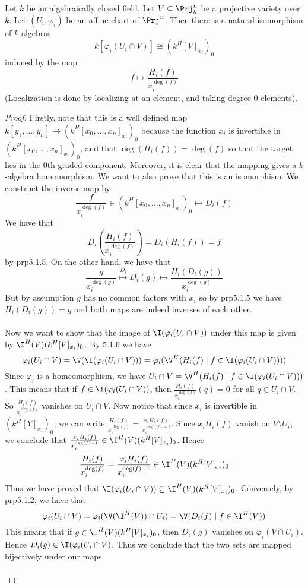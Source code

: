 \documentclass[a4paper]{article}
\begin{document}
\begin{prp}{}{} Let $k$ be an algebraically closed field. Let $V\subseteq\Prj_k^n$ be a projective variety over $k$. Let $(U_i,\varphi_i)$ be an affine chart of $\Prj^n$. Then there is a natural isomorphism of $k$-algebras $$k[\varphi_i(U_i\cap V)]\cong(k^H[V]_{x_i})_0$$ induced by the map $$f\mapsto\frac{H_i(f)}{x_i^{\deg(f)}}$$ (Localization is done by localizing at an element, and taking degree $0$ elements). 
\begin{proof}
Firstly, note that this is a well defined map $k[y_1,\dots,y_n]\to(k^H[x_0,\dots,x_n]_{x_i})_0$ because the function $x_i$ is invertible in $(k^H[x_0,\dots,x_n]_{x_i})_0$, and that $\deg(H_i(f))=\deg(f)$ so that the target lies in the $0$th graded component. Moreover, it is clear that the mapping gives a $k$-algebra homomorphism. We want to also prove that this is an isomorphism. We construct the inverse map by $$\frac{f}{x_i^{\deg(f)}}\in(k^H[x_0,\dots,x_n]_{x_i})_0\mapsto D_i(f)$$ We have that $$D_i\left(\frac{H_i(f)}{x_i^{\deg(f)}}\right)=D_i(H_i(f))=f$$ by prp5.1.5. On the other hand, we have that $$\frac{g}{x_i^{\deg(g)}}\overset{D_i}{\mapsto}D_i(g)\mapsto\frac{H_i(D_i(g))}{x_i^{\deg(g)}}$$ But by assumption $g$ has no common factors with $x_i$ so by prp5.1.5 we have $H_i(D_i(g))=g$ and both maps are indeed inverses of each other. \\~\\

Now we want to show that the image of $\I(\varphi_i(U_i\cap V))$ under this map is given by $\I^H(V)(k^H[V]_{x_i})_0$. By 5.1.6 we have $$\varphi_i(U_i\cap V)=\V(\I(\varphi_i(U_i\cap V)))=\varphi_i(\V^H(H_i(f)\;|\;f\in\I(\varphi_i(U_i\cap V))))$$ Since $\varphi_i$ is a homeomorphism, we have $U_i\cap V=\V^H(H_i(f)\;|\;f\in\I(\varphi_i(U_i\cap V)))$. This means that if $f\in\I(\varphi_i(U_i\cap V))$, then $\frac{H_i(f)}{x_i^{\deg(f)}}(q)=0$ for all $q\in U_i\cap V$. So $\frac{H_i(f)}{x_i^{\deg(f)}}$ vanishes on $U_i\cap V$. Now notice that since $x_i$ is invertible in $(k^H[Y]_{x_i})_0$, we can write $\frac{H_i(f)}{x_i^{\deg(f)}}=\frac{x_iH_i(f)}{x_i^{\deg(f)+1}}$. Since $x_iH_i(f)$ vanish on $V\setminus U_i$, we conclude that $\frac{x_iH_i(f)}{x_i^{\deg(f)+1}}\in\I^H(V)(k^H[V]_{x_i})_0$. Hence $$\frac{H_i(f)}{x_i^{\deg(f)}}=\frac{x_iH_i(f)}{x_i^{\deg(f)+1}}\in\I^H(V)(k^H[V]_{x_i})_0$$ Thus we have proved that $\I(\varphi_i(U_i\cap V))\subseteq\I^H(V)(k^H[V]_{x_i})_0$. Conversely, by prp5.1.2, we have that $$\varphi_i(U_i\cap V)=\varphi_i(\V(\I^H(V))\cap U_i)=\V(D_i(f)\;|\;f\in\I^H(V))$$ This means that if $g\in\I^H(V)(k^H[V]_{x_i})_0$, then $D_i(g)$ vanishes on $\varphi_i(V\cap U_i)$. Hence $D_i(g)\in\I(\varphi_i(U_i\cap V)$. Thus we conclude that the two sets are mapped bijectively under our maps. \\~\\


\end{proof}
\end{prp}
\end{document}
